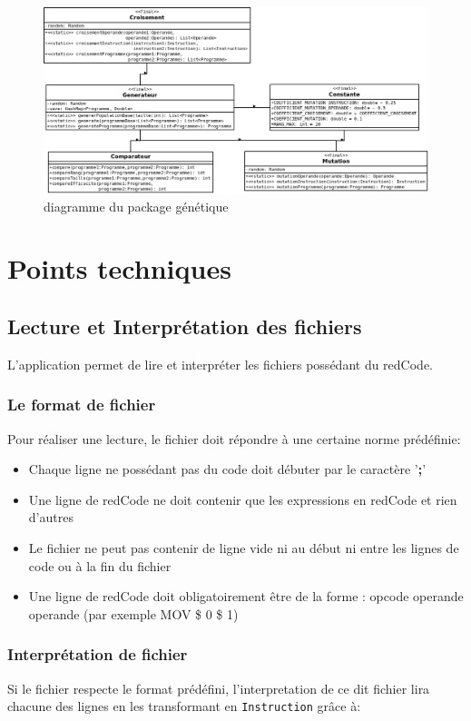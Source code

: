 \documentclass[12pt]{article}
\newcommand{\classname}[1]{\texttt{#1}}
\begin{document}
\begin{figure}[h!]
	\center
	\includegraphics[scale = 0.45]{Images/diagrammeGenetique.png}
	\caption{diagramme du package génétique}
\end{figure}
\newpage
\section{Points techniques}
\subsection{Lecture et Interprétation des fichiers}
L'application permet de lire et interpréter les fichiers possédant du redCode. 
\subsubsection*{Le format de fichier}
Pour réaliser une lecture, le fichier doit répondre à une certaine norme prédéfinie:
\begin{itemize}
	\item Chaque ligne ne possédant pas du code doit débuter par le caractère '\textbf{\color{red};}'
	\item Une ligne de redCode ne doit contenir que les expressions en redCode et rien d'autres
	\item Le fichier ne peut pas contenir de ligne vide ni au début ni entre les lignes de code ou à la fin du fichier
	\item Une ligne de redCode doit obligatoirement être de la forme : opcode operande operande (par exemple MOV \$ 0 \$ 1)
\end{itemize}
\subsubsection*{Interprétation de fichier}
Si le fichier respecte le format prédéfini, l'interpretation de ce dit fichier lira chacune des lignes en les transformant en \classname{Instruction}
grâce à:
\end{document}
